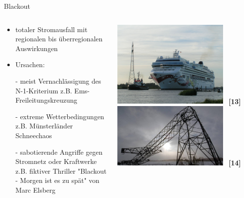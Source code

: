 \documentclass[aspectratio=1610, professionalfonts, 9pt]{beamer}
\begin{document}
\begin{frame}{Blackout}
  \begin{columns}
\begin{column}{0.5\textwidth}
\begin{itemize}
\item totaler Stromausfall mit regionalen bis überregionalen Auswirkungen
\item Ursachen:
\item[-]meist Vernachlässigung des N-1-Kriterium z.B. Ems-Freileitungskreuzung
\item[-]extreme Wetterbedingungen z.B. Münsterländer Schneechaos
\item[-]sabotierende Angriffe gegen Stromnetz oder Kraftwerke
   z.B. fiktiver Thriller "Blackout - Morgen ist es zu spät" von Marc Elsberg
\end{itemize}
\end{column}
\begin{column}{0.5\textwidth}
  \includegraphics[width=0.8\textwidth]{images/Emsland_Bild.JPG} \ \textbf{\textcolor{tugreen}{[13]}}\\
  \includegraphics[width=0.8\textwidth]{images/stromausfall-deutschland-muensterland.jpg} \ \textbf{\textcolor{tugreen}{[14]}}\\
\end{column}
\end{columns}
\end{frame}
\end{document}
